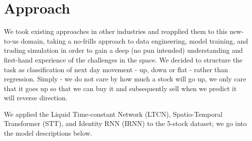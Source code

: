 \documentclass[10pt,twocolumn,letterpaper]{article}
\begin{document}
    \section{Approach}
We took existing approaches in other industries and reapplied them to this new-to-us domain, taking a no-frills approach to data engineering, model training, and trading simulation in order to gain a deep (no pun intended) understanding and first-hand experience of the challenges in the space. We decided to structure the task as classification of next day movement - up, down or flat - rather than regression. Simply - we do not care by how much a stock will go up, we only care that it goes up so that we can buy it and subsequently sell when we predict it will reverse direction.

We applied the  Liquid Time-constant Network (LTCN), Spatio-Temporal Transformer (STT), and Identity RNN (IRNN) to the 5-stock dataset; we go into the model descriptions below.
\end{document}
